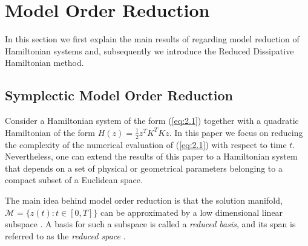 \section{Model Order Reduction} \label{sec:3}
In this section we first explain the main results of \cite{Maboudi:2016,Peng:2014di} regarding model reduction of Hamiltonian systems and, subsequently we introduce the Reduced Dissipative Hamiltonian method.

\subsection{Symplectic Model Order Reduction} \label{sec:3.1}
Consider a Hamiltonian system of the form (\ref{eq:2.1}) together with a quadratic Hamiltonian of the form $H(z) = \frac 1 2 z^T K^T K z$. In this paper we focus on reducing the complexity of the numerical evaluation of (\ref{eq:2.1}) with respect to time $t$. Nevertheless, one can extend the results of this paper to a Hamiltonian system that depends on a set of physical or geometrical parameters belonging to a compact subset of a Euclidean space.

The main idea behind model order reduction is that the solution manifold, $\mathcal M = \{ z(t) : t \in [0,T] \}$ can be approximated by a low dimensional linear subspace \cite{hesthaven2015certified,quarteroni2015reduced}. A basis for such a subspace is called a \emph{reduced basis}, and its span is referred to as the \emph{reduced space} \cite{hesthaven2015certified}.

